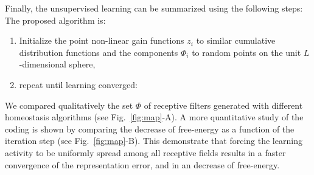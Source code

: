 \documentclass[a4paper, 11pt, draft]{article} %
\newcommand{\coef}{\mathbf{a}} %
\newcommand{\image}{\mathbf{I}} %
\newcommand{\dico}{\Phi} %
\newcommand{\norm}[1]{|\!| #1 |\!|}
\newcommand{\seeEq}[1]{Eq.~\ref{eq:#1}}%
\begin{document}
Finally, the unsupervised learning can be summarized using the following steps:
The proposed algorithm is:
\begin{enumerate}%
\item Initialize the point non-linear gain functions $z_i$ to similar cumulative distribution functions and the components $\dico_i$ to random points on the unit $L$-dimensional sphere,%
\item repeat until learning converged:%
\end{enumerate}
We compared qualitatively the set $\dico$ of receptive filters generated with different homeostasis algorithms (see Fig.~\ref{fig:map}-A). A more quantitative study of the coding is shown by comparing the decrease of free-energy as a function of the iteration step (see Fig.~\ref{fig:map}-B). This demonstrate that forcing the learning activity to be uniformly spread among all receptive fields results in a faster convergence of the representation error, and in an decrease of free-energy. 
\end{document}
